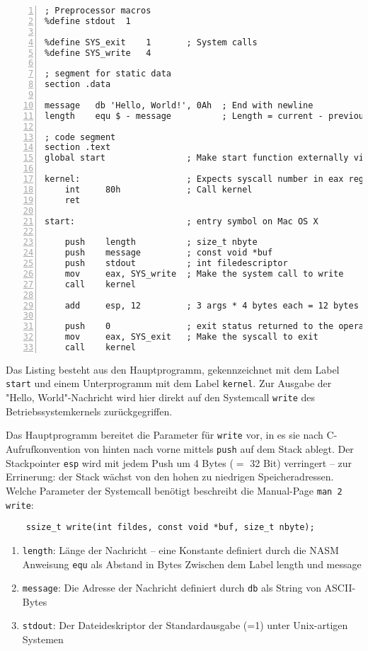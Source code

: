 \begin{lstlisting}[numbers=left,caption=hello.asm]
; Preprocessor macros
%define stdout  1

%define SYS_exit    1       ; System calls
%define SYS_write   4

; segment for static data
section .data

message   db 'Hello, World!', 0Ah  ; End with newline
length    equ $ - message          ; Length = current - previous address

; code segment
section .text
global start                ; Make start function externally visible for linker

kernel:                     ; Expects syscall number in eax register
    int     80h             ; Call kernel
    ret

start:                      ; entry symbol on Mac OS X

    push    length          ; size_t nbyte
    push    message         ; const void *buf
    push    stdout          ; int filedescriptor
    mov     eax, SYS_write  ; Make the system call to write
    call    kernel
   
    add     esp, 12         ; 3 args * 4 bytes each = 12 bytes

    push    0               ; exit status returned to the operating system
    mov     eax, SYS_exit   ; Make the syscall to exit
    call    kernel
\end{lstlisting}

Das Listing besteht aus den Hauptprogramm, gekennzeichnet mit dem Label \texttt{start} und einem Unterprogramm mit dem Label \texttt{kernel}. Zur Ausgabe der "Hello, World"-Nachricht wird hier direkt auf den Systemcall \texttt{write} des Betriebssystemkernels zurückgegriffen. 

Das Hauptprogramm bereitet die Parameter für \texttt{write} vor, in es sie nach C-Aufrufkonvention von hinten nach vorne mittels \texttt{push} auf dem Stack ablegt. Der Stackpointer \texttt{esp} wird mit jedem Push um 4 Bytes ($=$ 32 Bit) verringert – zur Errinerung: der Stack wächst von den hohen zu niedrigen Speicheradressen. Welche Parameter der Systemcall benötigt beschreibt die Manual-Page \texttt{man 2 write}:

\begin{lstlisting}
	ssize_t write(int fildes, const void *buf, size_t nbyte);
\end{lstlisting}

\begin{enumerate}
\item {\tt length}:	Länge der Nachricht – eine Konstante definiert durch die
NASM Anweisung {\tt equ} als Abstand in Bytes Zwischen dem Label length und message
\item {\tt message}: Die Adresse der Nachricht definiert durch {\tt db} als String von ASCII-Bytes
\item {\tt stdout}: Der Dateideskriptor der Standardausgabe (=1) unter Unix-artigen Systemen
\end{enumerate}

